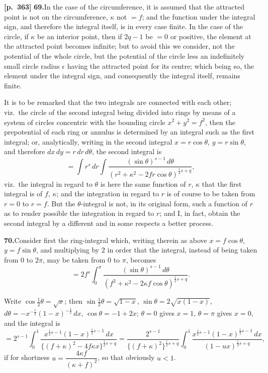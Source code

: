 \documentclass[11pt]{article}
\begin{document}
\bigskip

\noindent\textbf{[p.~363]}\quad
\textbf{69.}\quad In the case of the circumference, it is assumed that the attracted point is not on the circumference, $\kappa$ not $=f$; and the function under the integral sign, and therefore the integral itself, is in every case finite. In the case of the circle, if $\kappa$ be an interior point, then if $2q-1$ be $=0$ or positive, the element at the attracted point becomes infinite; but to avoid this we consider, not the potential of the whole circle, but the potential of the circle less an indefinitely small circle radius $\epsilon$ having the attracted point for its centre; which being so, the element under the integral sign, and consequently the integral itself, remains finite.

It is to be remarked that the two integrals are connected with each other; viz.\ the circle of the second integral being divided into rings by means of a system of circles concentric with the bounding circle $x^{2}+y^{2}=f^{2}$, then the prepotential of each ring or annulus is determined by an integral such as the first integral; or, analytically, writing in the second integral $x=r\cos\theta$, $y=r\sin\theta$, and therefore $dx\,dy = r\,dr\,d\theta$, the second integral is
\[
= \int r^{s}\,dr\int\frac{(\sin\theta)^{s-1}\,d\theta}{(r^{2}+\kappa^{2}-2f r\cos\theta)^{\frac{1}{2}s+q}},
\]
viz.\ the integral in regard to $\theta$ is here the same function of $r$, $\kappa$ that the first integral is of $f$, $\kappa$; and the integration in regard to $r$ is of course to be taken from $r=0$ to $r=f$. But the $\theta$-integral is not, in its original form, such a function of $r$ as to render possible the integration in regard to $r$; and I, in fact, obtain the second integral by a different and in some respects a better process.

\bigskip

\noindent\textbf{70.}\quad Consider first the ring-integral which, writing therein as above $x=f\cos\theta$, $y=f\sin\theta$, and multiplying by $2$ in order that the integral, instead of being taken from $0$ to $2\pi$, may be taken from $0$ to $\pi$, becomes
\[
= 2f^{s}\int_{0}^{\pi}\frac{(\sin\theta)^{s-1}\,d\theta}{(f^{2}+\kappa^{2}-2\kappa f\cos\theta)^{\frac{1}{2}s+q}}.
\]

Write $\cos\tfrac{1}{2}\theta = \sqrt{x}$; then $\sin\tfrac{1}{2}\theta = \sqrt{1-x}$, $\sin\theta = 2\sqrt{x(1-x)}$, $d\theta = -x^{-\frac{1}{2}}(1-x)^{-\frac{1}{2}}\,dx$, $\cos\theta = -1+2x$; $\theta = 0$ gives $x=1$, $\theta = \pi$ gives $x=0$, and the integral is
\[
= 2^{s-1}\int_{0}^{1}\frac{x^{\frac{1}{2}s-1}(1-x)^{\frac{1}{2}s-1}\,dx}{\{(f+\kappa)^{2} - 4f\kappa x\}^{\frac{1}{2}s+q}}
= \frac{2^{s-1}}{\{(f+\kappa)^{2}\}^{\frac{1}{2}s+q}}\int_{0}^{1}\frac{x^{\frac{1}{2}s-1}(1-x)^{\frac{1}{2}s-1}\,dx}{(1-ux)^{\frac{1}{2}s+q}},
\]
if for shortness $u = \dfrac{4\kappa f}{(\kappa+f)^{2}}$, so that obviously $u<1$.
\end{document}
